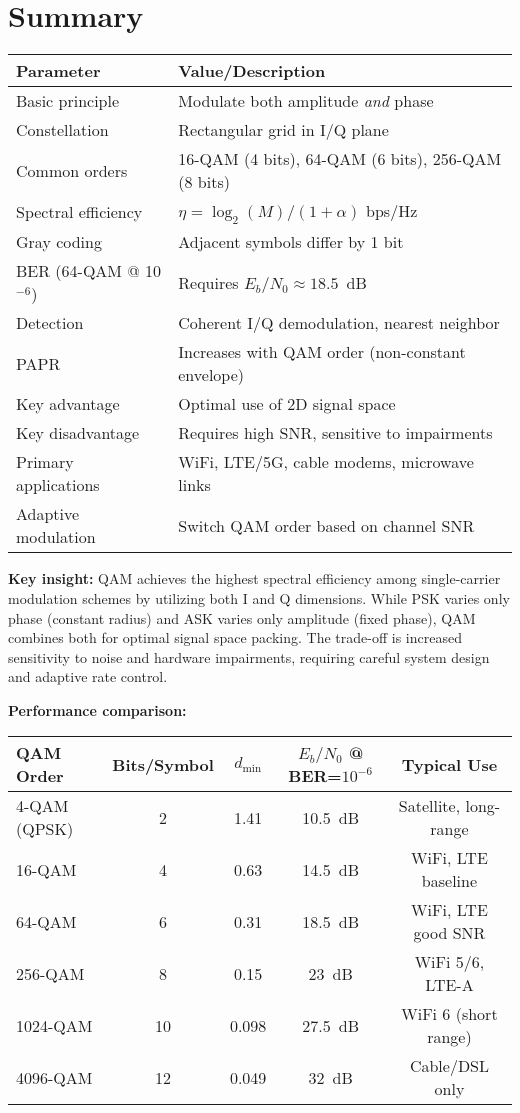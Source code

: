 \section{Summary}

\begin{center}
\begin{tabular}{@{}ll@{}}
\toprule
\textbf{Parameter} & \textbf{Value/Description} \\
\midrule
Basic principle & Modulate both amplitude \emph{and} phase \\
Constellation & Rectangular grid in I/Q plane \\
Common orders & 16-QAM (4 bits), 64-QAM (6 bits), 256-QAM (8 bits) \\
Spectral efficiency & $\eta = \log_2(M)/(1+\alpha)$ bps/Hz \\
Gray coding & Adjacent symbols differ by 1 bit \\
BER (64-QAM @ 10$^{-6}$) & Requires $E_b/N_0 \approx 18.5$~dB \\
Detection & Coherent I/Q demodulation, nearest neighbor \\
PAPR & Increases with QAM order (non-constant envelope) \\
Key advantage & Optimal use of 2D signal space \\
Key disadvantage & Requires high SNR, sensitive to impairments \\
Primary applications & WiFi, LTE/5G, cable modems, microwave links \\
Adaptive modulation & Switch QAM order based on channel SNR \\
\bottomrule
\end{tabular}
\end{center}

\textbf{Key insight:} QAM achieves the highest spectral efficiency among single-carrier modulation schemes by utilizing both I and Q dimensions. While PSK varies only phase (constant radius) and ASK varies only amplitude (fixed phase), QAM combines both for optimal signal space packing. The trade-off is increased sensitivity to noise and hardware impairments, requiring careful system design and adaptive rate control.

\textbf{Performance comparison:}

\begin{center}
\begin{tabular}{@{}lcccc@{}}
\toprule
\textbf{QAM Order} & \textbf{Bits/Symbol} & \textbf{$d_{\min}$} & \textbf{$E_b/N_0$ @ BER=$10^{-6}$} & \textbf{Typical Use} \\
\midrule
4-QAM (QPSK) & 2 & 1.41 & 10.5~dB & Satellite, long-range \\
16-QAM & 4 & 0.63 & 14.5~dB & WiFi, LTE baseline \\
64-QAM & 6 & 0.31 & 18.5~dB & WiFi, LTE good SNR \\
256-QAM & 8 & 0.15 & 23~dB & WiFi 5/6, LTE-A \\
1024-QAM & 10 & 0.098 & 27.5~dB & WiFi 6 (short range) \\
4096-QAM & 12 & 0.049 & 32~dB & Cable/DSL only \\
\bottomrule
\end{tabular}
\end{center}

